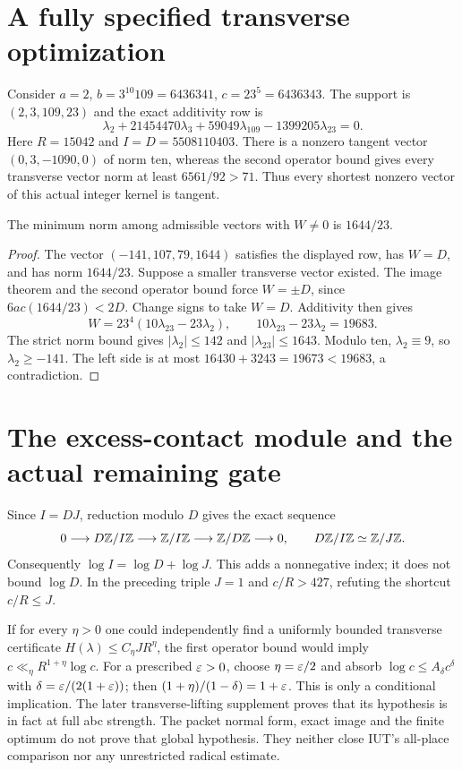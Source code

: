 \section{A fully specified transverse optimization}
Consider $a=2$, $b=3^{10}109=6436341$, $c=23^5=6436343$. The support is $(2,3,109,23)$ and the exact additivity row is
\[
 \lambda_2+21454470\lambda_3+59049\lambda_{109}-1399205\lambda_{23}=0.
\]
Here $R=15042$ and $I=D=5508110403$. There is a nonzero tangent vector $(0,3,-1090,0)$ of norm ten, whereas the second operator bound gives every transverse vector norm at least $6561/92>71$. Thus every shortest nonzero vector of this actual integer kernel is tangent.
\begin{theorem}\label{normal:thm:optimum}
The minimum norm among admissible vectors with $W\ne0$ is $1644/23$.
\end{theorem}
\begin{proof}
The vector $(-141,107,79,1644)$ satisfies the displayed row, has $W=D$, and has norm $1644/23$. Suppose a smaller transverse vector existed. The image theorem and the second operator bound force $W=\pm D$, since $6ac(1644/23)<2D$. Change signs to take $W=D$. Additivity then gives
\[
 W=23^4(10\lambda_{23}-23\lambda_2),\qquad
 10\lambda_{23}-23\lambda_2=19683.
\]
The strict norm bound gives $|\lambda_2|\le142$ and $|\lambda_{23}|\le1643$. Modulo ten, $\lambda_2\equiv9$, so $\lambda_2\ge-141$. The left side is at most $16430+3243=19673<19683$, a contradiction.
\end{proof}

\section{The excess-contact module and the actual remaining gate}
Since $I=DJ$, reduction modulo $D$ gives the exact sequence
\[
 0\longrightarrow D\mathbb Z/I\mathbb Z\longrightarrow\mathbb Z/I\mathbb Z\longrightarrow\mathbb Z/D\mathbb Z\longrightarrow0,
 \qquad D\mathbb Z/I\mathbb Z\simeq\mathbb Z/J\mathbb Z.
\]
Consequently $\log I=\log D+\log J$. This adds a nonnegative index; it does not bound $\log D$. In the preceding triple $J=1$ and $c/R>427$, refuting the shortcut $c/R\le J$.

If for every $\eta>0$ one could independently find a uniformly bounded transverse certificate $H(\lambda)\le C_\eta J R^\eta$, the first operator bound would imply $c\ll_\eta R^{1+\eta}\log c$. For a prescribed $\varepsilon>0$, choose $\eta=\varepsilon/2$ and absorb $\log c\le A_\delta c^\delta$ with $\delta=\varepsilon/(2(1+\varepsilon))$; then $(1+\eta)/(1-\delta)=1+\varepsilon$. This is only a conditional implication. The later transverse-lifting supplement proves that its hypothesis is in fact at full abc strength.
The packet normal form, exact image and the finite optimum do not prove that global hypothesis. They neither close IUT's all-place comparison nor any unrestricted radical estimate.

\endgroup
